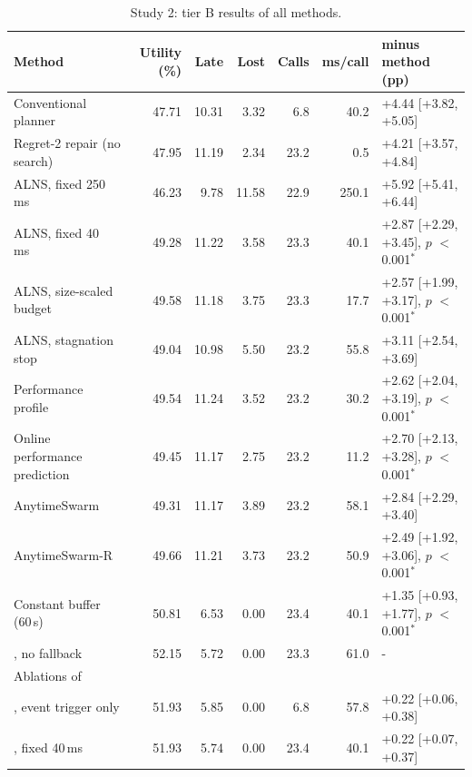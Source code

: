 \begin{table}[t]
\caption{Study 2: tier B results of all methods.}\label{tab:s2main}
\centering\small
\setlength{\tabcolsep}{3pt}
\begin{threeparttable}
\begin{tabular}{lrrrrrl}
\toprule
Method & Utility (\%) & Late & Lost & Calls & ms/call & \mname{} minus method (pp) \\
\midrule
Conventional planner & 47.71 & 10.31 & 3.32 & 6.8 & 40.2 & +4.44 [+3.82, +5.05] \\
Regret-2 repair (no search) & 47.95 & 11.19 & 2.34 & 23.2 & 0.5 & +4.21 [+3.57, +4.84] \\
ALNS, fixed 250 ms~\cite{ropke2006adaptive} & 46.23 & 9.78 & 11.58 & 22.9 & 250.1 & +5.92 [+5.41, +6.44] \\
ALNS, fixed 40 ms~\cite{ropke2006adaptive} & 49.28 & 11.22 & 3.58 & 23.3 & 40.1 & +2.87 [+2.29, +3.45], $p$ $<$0.001$^{\ast}$ \\
ALNS, size-scaled budget & 49.58 & 11.18 & 3.75 & 23.3 & 17.7 & +2.57 [+1.99, +3.17], $p$ $<$0.001$^{\ast}$ \\
ALNS, stagnation stop & 49.04 & 10.98 & 5.50 & 23.2 & 55.8 & +3.11 [+2.54, +3.69] \\
Performance profile~\cite{boddy1994deliberation,zilberstein1996using} & 49.54 & 11.24 & 3.52 & 23.2 & 30.2 & +2.62 [+2.04, +3.19], $p$ $<$0.001$^{\ast}$ \\
Online performance prediction~\cite{svegliato2018meta} & 49.45 & 11.17 & 2.75 & 23.2 & 11.2 & +2.70 [+2.13, +3.28], $p$ $<$0.001$^{\ast}$ \\
AnytimeSwarm & 49.31 & 11.17 & 3.89 & 23.2 & 58.1 & +2.84 [+2.29, +3.40] \\
AnytimeSwarm-R & 49.66 & 11.21 & 3.73 & 23.2 & 50.9 & +2.49 [+1.92, +3.06], $p$ $<$0.001$^{\ast}$ \\
Constant buffer (60\,s)~\cite{jabali2015selfimposed} & 50.81 & 6.53 & 0.00 & 23.4 & 40.1 & +1.35 [+0.93, +1.77], $p$ $<$0.001$^{\ast}$ \\
\mname{}, no fallback & 52.15 & 5.72 & 0.00 & 23.3 & 61.0 & - \\
\midrule
\multicolumn{7}{l}{Ablations of \mname{}} \\
\mname{}, event trigger only & 51.93 & 5.85 & 0.00 & 6.8 & 57.8 & +0.22 [+0.06, +0.38] \\
\mname{}, fixed 40\,ms & 51.93 & 5.74 & 0.00 & 23.4 & 40.1 & +0.22 [+0.07, +0.37] \\

\end{tabular}
\end{threeparttable}
\end{table}
